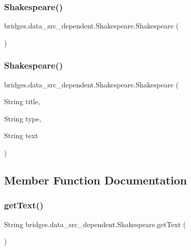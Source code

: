 \subsubsection{\texorpdfstring{Shakespeare()}{Shakespeare()}\hspace{0.1cm}{\footnotesize\ttfamily [1/2]}}
{\footnotesize\ttfamily bridges.\+data\+\_\+src\+\_\+dependent.\+Shakespeare.\+Shakespeare (\begin{DoxyParamCaption}{ }\end{DoxyParamCaption})}

\hypertarget{classbridges_1_1data__src__dependent_1_1_shakespeare_aa5a5390d6f7afe3d63f4ad7f9779f9e9}{}\label{classbridges_1_1data__src__dependent_1_1_shakespeare_aa5a5390d6f7afe3d63f4ad7f9779f9e9} 
\subsubsection{\texorpdfstring{Shakespeare()}{Shakespeare()}\hspace{0.1cm}{\footnotesize\ttfamily [2/2]}}
{\footnotesize\ttfamily bridges.\+data\+\_\+src\+\_\+dependent.\+Shakespeare.\+Shakespeare (\begin{DoxyParamCaption}\item[{String}]{title,  }\item[{String}]{type,  }\item[{String}]{text }\end{DoxyParamCaption})}



\subsection{Member Function Documentation}
\hypertarget{classbridges_1_1data__src__dependent_1_1_shakespeare_a5a5cffa6bf3d35182ba1eed2be19d74d}{}\label{classbridges_1_1data__src__dependent_1_1_shakespeare_a5a5cffa6bf3d35182ba1eed2be19d74d} 
\subsubsection{\texorpdfstring{get\+Text()}{getText()}}
{\footnotesize\ttfamily String bridges.\+data\+\_\+src\+\_\+dependent.\+Shakespeare.\+get\+Text (\begin{DoxyParamCaption}{ }\end{DoxyParamCaption})}

